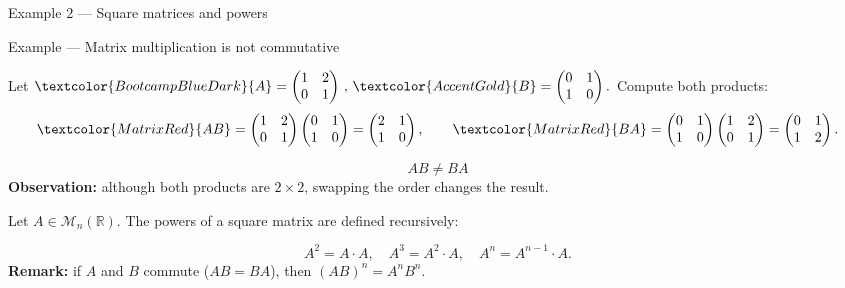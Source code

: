\documentclass[aspectratio=169]{beamer}
\begin{document}
\begin{frame}{Example $2$ — Square matrices and powers}

\begin{exampleblock}{Example — Matrix multiplication is not commutative}


\vspace{1mm}
Let $
\textcolor{BootcampBlueDark}{A} =
\begin{pmatrix}
1 & 2\\
0 & 1
\end{pmatrix} \,,\,
\textcolor{AccentGold}{B} =
\begin{pmatrix}
0 & 1\\
1 & 0
\end{pmatrix}.
$
Compute both products:
\pause
\[
\textcolor{MatrixRed}{AB} =
\begin{pmatrix}
1 & 2\\
0 & 1
\end{pmatrix}
\begin{pmatrix}
0 & 1\\
1 & 0
\end{pmatrix}
=
\begin{pmatrix}
2 & 1\\
1 & 0
\end{pmatrix},
\qquad
\textcolor{MatrixRed}{BA} =
\begin{pmatrix}
0 & 1\\
1 & 0
\end{pmatrix}
\begin{pmatrix}
1 & 2\\
0 & 1
\end{pmatrix}
=
\begin{pmatrix}
0 & 1\\
1 & 2
\end{pmatrix}.
\]

\pause
\vspace{-5mm}
\[
\boxed{AB \neq BA}
\]
\textbf{Observation:} although both products are $2\times2$, swapping the order changes the result.
\end{exampleblock}

\vspace{-5mm}

\begin{block}{}
Let $A \in \mathcal{M}_n (\mathbb{R})$. The powers of a square matrix are defined recursively:

\vspace{-6mm}

\[
A^2 = A\cdot A,\quad A^3 = A^2\cdot A,\quad
A^n = A^{n-1}\cdot A.
\]
\pause
\textbf{Remark:} if $A$ and $B$ commute ($AB=BA$), then $(AB)^n=A^nB^n$.
\end{block}
\end{frame}
\end{document}
